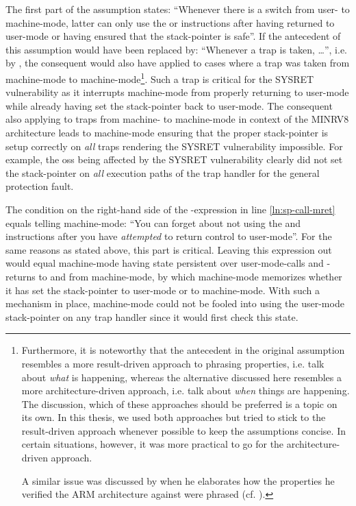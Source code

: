The first part of the  assumption states: \enquote{Whenever there is a switch from user- to machine-mode, latter can only use the  or  instructions after having returned to user-mode or having ensured that the stack-pointer is safe}.
If the antecedent of this assumption would have been replaced by: \enquote{Whenever a trap is taken, \dots}, i.e. by , the consequent would also have applied to cases where a trap was taken from machine-mode to machine-mode\footnote{
    Furthermore, it is noteworthy that the antecedent in the original assumption resembles a more result-driven approach to phrasing properties, i.e. talk about \textit{what} is happening, whereas the alternative discussed here resembles a more architecture-driven approach, i.e. talk about \textit{when} things are happening.
    The discussion, which of these approaches should be preferred is a topic on its own.
    In this thesis, we used both approaches but tried to stick to the result-driven approach whenever possible to keep the assumptions concise.
    In certain situations, however, it was more practical to go for the architecture-driven approach.

    A similar issue was discussed by \citeauthor{Reid17} when he elaborates how the properties he verified the ARM architecture against were phrased (cf. \cite[p.88:4]{Reid17}).
}.
Such a trap is critical for the SYSRET vulnerability as it interrupts machine-mode from properly returning to user-mode while already having set the stack-pointer back to user-mode.
The consequent also applying to traps from machine- to machine-mode in context of the MINRV8 architecture leads to machine-mode ensuring that the proper stack-pointer is setup correctly on \textit{all} traps rendering the SYSRET vulnerability impossible.
For example, the \glspl{os} being affected by the SYSRET vulnerability clearly did not set the stack-pointer on \textit{all} execution paths of the trap handler for the general protection fault.

The condition  on the right-hand side of the -expression in line \ref{ln:sp-call-mret} equals telling machine-mode: \enquote{You can forget about not using the  and  instructions after you have \textit{attempted} to return control to user-mode}.
For the same reasons as stated above, this part is critical.
Leaving this expression out would equal machine-mode having state persistent over user-mode-calls and -returns to and from machine-mode, by which machine-mode memorizes whether it has set the stack-pointer to user-mode or to machine-mode.
With such a mechanism in place, machine-mode could not be fooled into using the user-mode stack-pointer on any trap handler since it would first check this state.

